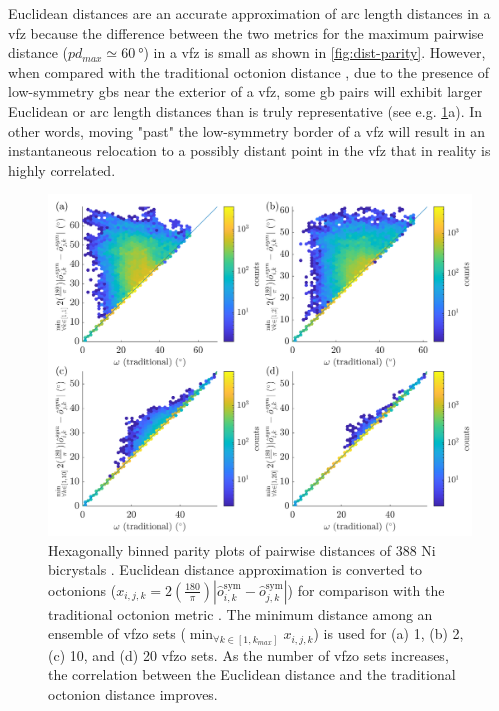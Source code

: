 \documentclass[final,twocolumn,12pt]{elsarticle}
\begin{document}
Euclidean distances are an accurate approximation of arc length distances in a \gls{vfz} because the difference between the two metrics for the maximum pairwise distance ($pd_{max} \simeq \SI{60}{\degree}$) in a \gls{vfz} is small as shown in \cref{fig:dist-parity}. However, when compared with the traditional octonion distance \cite{francisGeodesicOctonionMetric2019}, due to the presence of low-symmetry \glspl{gb} near the exterior of a \gls{vfz}, some \gls{gb} pairs will exhibit larger Euclidean or arc length distances than is truly representative (see e.g. \cref{fig:dist-ensemble-k1-2-10-20}a). In other words, moving "past" the low-symmetry border of a \gls{vfz} will result in an instantaneous relocation to a possibly distant point in the \gls{vfz} that in reality is highly correlated.
\begin{figure}[h!]
    \centering
    \includegraphics[scale=1]{figures/dist-ensemble-k1-2-10-20.png}
    \caption{Hexagonally binned parity plots of pairwise distances of 388 Ni bicrystals \cite{olmstedSurveyComputedGrain2009a}. Euclidean distance approximation is converted to octonions ($x_{i,j,k}=2\left(\frac{180}{\pi}\right)|\hat{o}_{i,k}^{\text{sym}}-\hat{o}_{j,k}^{\text{sym}}|$) for comparison with the traditional octonion metric \cite{chesserLearningGrainBoundary2020}. The minimum distance among an ensemble of \gls{vfzo} sets ($\min_{\forall k \in [1,k_{max}]}x_{i,j,k}$) is used for (a) 1, (b) 2, (c) 10, and (d) 20 \gls{vfzo} sets. As the number of \gls{vfzo} sets increases, the correlation between the Euclidean distance and the traditional octonion distance improves.}
    \label{fig:dist-ensemble-k1-2-10-20}
\end{figure}
\end{document}
